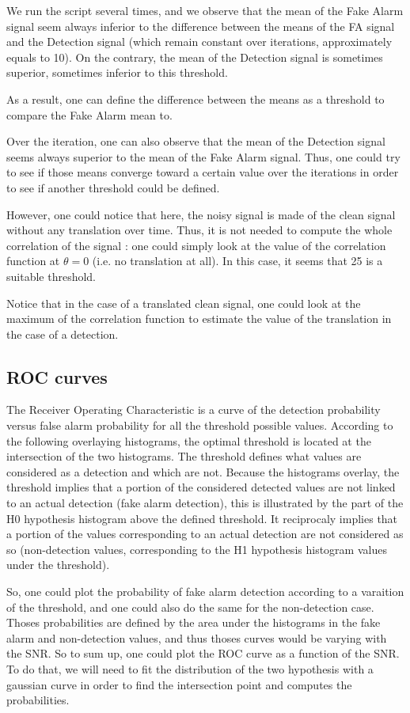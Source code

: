 We run the script several times, and we observe that the mean of the Fake Alarm signal seem always inferior to the difference between the means of the FA signal and the Detection signal (which remain constant over iterations, approximately equals to 10). On the contrary, the mean of the Detection signal is sometimes superior, sometimes inferior to this threshold.

As a result, one can define the difference between the means as a threshold to compare the Fake Alarm mean to.

Over the iteration, one can also observe that the mean of the Detection signal seems always superior to the mean of the Fake Alarm signal. Thus, one could try to see if those means converge toward a certain value over the iterations in order to see if another threshold could be defined.

However, one could notice that here, the noisy signal is made of the clean signal without any translation over time. Thus, it is not needed to compute the whole correlation of the signal : one could simply look at the value of the correlation function at $\theta = 0 $ (i.e. no translation at all). In this case, it seems that 25 is a suitable threshold.

Notice that in the case of a translated clean signal, one could look at the maximum of the correlation function to estimate the value of the translation in the case of a detection.

\subsection{ROC curves}
The Receiver Operating Characteristic is a curve of the detection probability versus false alarm probability for all the threshold possible values. According to the following overlaying histograms, the optimal threshold is located at the intersection of the two histograms. The threshold defines what values are considered as a detection and which are not. Because the histograms overlay, the threshold implies that a portion of the considered detected values are not linked to an actual detection (fake alarm detection), this is illustrated by the part of the H0 hypothesis histogram above the defined threshold. It reciprocaly implies that a portion of the values corresponding to an actual detection are not considered as so (non-detection values, corresponding to the H1 hypothesis histogram values under the threshold).


So, one could plot the probability of fake alarm detection according to a varaition of the threshold, and one could also do the same for the non-detection case. Thoses probabilities are defined by the area under the histograms in the fake alarm and non-detection values, and thus thoses curves would be varying with the SNR. So to sum up, one could plot the ROC curve as a function of the SNR. To do that, we will need to fit the distribution of the two hypothesis with a gaussian curve in order to find the intersection point and computes the probabilities.



